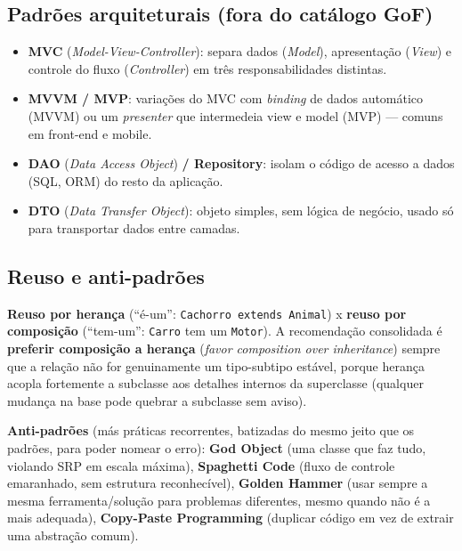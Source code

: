 \subsection{Padrões arquiteturais (fora do catálogo GoF)}

\begin{conceito}
\begin{itemize}
\item \textbf{MVC} (\textit{Model-View-Controller}): separa dados
(\textit{Model}), apresentação (\textit{View}) e controle do fluxo
(\textit{Controller}) em três responsabilidades distintas.
\item \textbf{MVVM / MVP}: variações do MVC com \textit{binding} de dados
automático (MVVM) ou um \textit{presenter} que intermedeia view e model
(MVP) --- comuns em front-end e mobile.
\item \textbf{DAO} (\textit{Data Access Object}) \textbf{/ Repository}:
isolam o código de acesso a dados (SQL, ORM) do resto da aplicação.
\item \textbf{DTO} (\textit{Data Transfer Object}): objeto simples, sem
lógica de negócio, usado só para transportar dados entre camadas.
\end{itemize}
\end{conceito}

\subsection{Reuso e anti-padrões}

\begin{conceito}
\textbf{Reuso por herança} (“é-um”: \texttt{Cachorro extends Animal}) x
\textbf{reuso por composição} (“tem-um”: \texttt{Carro} tem um
\texttt{Motor}). A recomendação consolidada é \textbf{preferir composição a
herança} (\textit{favor composition over inheritance}) sempre que a
relação não for genuinamente um tipo-subtipo estável, porque herança
acopla fortemente a subclasse aos detalhes internos da superclasse
(qualquer mudança na base pode quebrar a subclasse sem aviso).

\textbf{Anti-padrões} (más práticas recorrentes, batizadas do mesmo jeito
que os padrões, para poder nomear o erro): \textbf{God Object} (uma classe
que faz tudo, violando SRP em escala máxima), \textbf{Spaghetti Code}
(fluxo de controle emaranhado, sem estrutura reconhecível),
\textbf{Golden Hammer} (usar sempre a mesma ferramenta/solução para
problemas diferentes, mesmo quando não é a mais adequada),
\textbf{Copy-Paste Programming} (duplicar código em vez de extrair uma
abstração comum).
\end{conceito}

